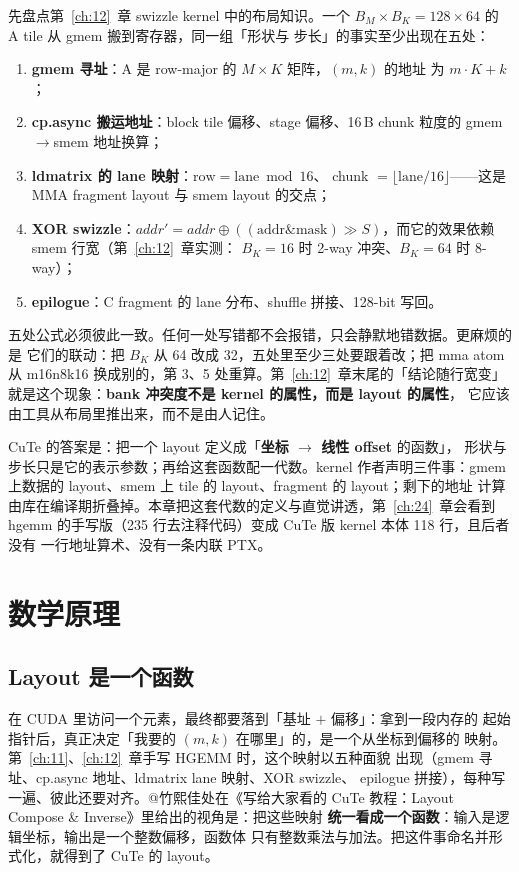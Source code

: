 先盘点第~\ref{ch:12}~章 swizzle kernel 中的布局知识。一个
$B_M\times B_K = 128\times64$ 的 A tile 从 gmem 搬到寄存器，同一组「形状与
步长」的事实至少出现在五处：

\begin{enumerate}
  \item \textbf{gmem 寻址}：A 是 row-major 的 $M\times K$ 矩阵，$(m,k)$ 的地址
        为 $m\cdot K+k$；
  \item \textbf{cp.async 搬运地址}：block tile 偏移、stage 偏移、16\,B chunk
        粒度的 gmem$\to$smem 地址换算；
  \item \textbf{ldmatrix 的 lane 映射}：$\mathrm{row}=\mathrm{lane}\bmod16$、
        chunk $=\lfloor\mathrm{lane}/16\rfloor$——这是 MMA fragment layout 与
        smem layout 的交点；
  \item \textbf{XOR swizzle}：$addr' = addr \oplus ((\mathrm{addr} \mathbin{\&}
        \mathrm{mask}) \gg S)$，而它的效果依赖 smem 行宽（第~\ref{ch:12}~章实测：
        $B_K{=}16$ 时 2-way 冲突、$B_K{=}64$ 时 8-way）；
  \item \textbf{epilogue}：C fragment 的 lane 分布、shuffle 拼接、128-bit 写回。
\end{enumerate}

五处公式必须彼此一致。任何一处写错都不会报错，只会静默地错数据。更麻烦的是
它们的联动：把 $B_K$ 从 64 改成 32，五处里至少三处要跟着改；把 mma atom 从
m16n8k16 换成别的，第 3、5 处重算。第~\ref{ch:12}~章末尾的「结论随行宽变」
就是这个现象：\textbf{bank 冲突度不是 kernel 的属性，而是 layout 的属性}，
它应该由工具从布局里推出来，而不是由人记住。

CuTe 的答案是：把一个 layout 定义成「\textbf{坐标 $\to$ 线性 offset} 的函数」，
形状与步长只是它的表示参数；再给这套函数配一代数。kernel 作者声明三件事：gmem
上数据的 layout、smem 上 tile 的 layout、fragment 的 layout；剩下的地址
计算由库在编译期折叠掉。本章把这套代数的定义与直觉讲透，第~\ref{ch:24}~章会看到
hgemm 的手写版（235 行去注释代码）变成 CuTe 版 kernel 本体 118 行，且后者没有
一行地址算术、没有一条内联 PTX。

\section{数学原理}

\subsection{Layout 是一个函数}

在 CUDA 里访问一个元素，最终都要落到「基址 $+$ 偏移」：拿到一段内存的
起始指针后，真正决定「我要的 $(m,k)$ 在哪里」的，是一个从坐标到偏移的
映射。第~\ref{ch:11}、\ref{ch:12}~章手写 HGEMM 时，这个映射以五种面貌
出现（gmem 寻址、cp.async 地址、ldmatrix lane 映射、XOR swizzle、
epilogue 拼接），每种写一遍、彼此还要对齐。@竹熙佳处在《写给大家看的
CuTe 教程：Layout Compose \& Inverse》里给出的视角是：把这些映射
\textbf{统一看成一个函数}：输入是逻辑坐标，输出是一个整数偏移，函数体
只有整数乘法与加法。把这件事命名并形式化，就得到了 CuTe 的 layout。


